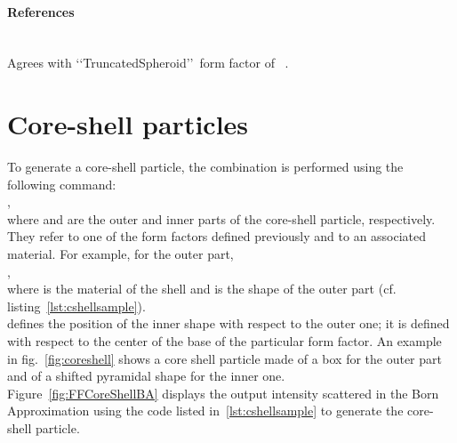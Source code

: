 \paragraph{References}\strut\\
Agrees with \lq\lq TruncatedSpheroid\rq\rq\ form factor
of \IsGISAXS~\cite{Laz02}.



\clearpage
\section{Core-shell particles} \label{sec:CoreShell}

To generate a core-shell particle, the combination is performed using the following command:\\
,\\
where  and  are the outer and inner parts of the core-shell particle, respectively. They refer to one of the form factors defined previously and to an associated material. For example, for the outer part,\\ ,\\ where  is the material of the shell and  is the shape of the outer part (cf. listing~\ref{lst:cshellsample}). \\  defines the position of the inner shape with respect to the outer one; it is defined with respect to the center of the base of the particular form factor. An example in fig.~\ref{fig:coreshell} shows a core shell particle made of a box for the outer part and of a shifted pyramidal shape for the inner one.\\

Figure~\ref{fig:FFCoreShellBA} displays the output intensity scattered in the Born Approximation using the code listed in~\ref{lst:cshellsample} to generate the core-shell particle. 

